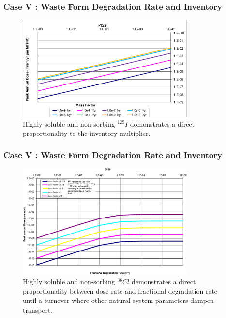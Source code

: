 \begin{frame}[c]
  \frametitle{Case V : Waste Form Degradation Rate and Inventory}

\begin{figure}[ht!]
\centering
\includegraphics[width=0.8\textwidth]{WFDegAndInv/I-129-MF.eps}
\caption{
Highly soluble and non-sorbing $^{129}I$ domonstrates a direct 
proportionality to the inventory multiplier.}
\label{fig:WFDegI129MF}
\end{figure}
\end{frame}

\begin{frame}[c]
  \frametitle{Case V : Waste Form Degradation Rate and Inventory}

\begin{figure}[ht!]
\centering
\includegraphics[width=0.8\textwidth]{WFDegAndInv/Cl-36.eps}
\caption{
Highly soluble and non-sorbing $^{36}Cl$ demonstrates a direct proportionality between dose rate and 
fractional degradation rate until a turnover where other natural system 
parameters dampen transport.} 
\label{fig:WFDegCl36}
\end{figure}

\end{frame}

